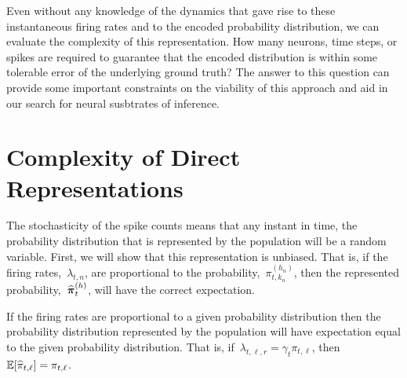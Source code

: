 Even without any knowledge of the dynamics that gave rise
to these instantaneous firing rates and to the
encoded probability distribution, we can evaluate the complexity
of this representation. How many neurons, time steps, or spikes
are required to guarantee that the encoded distribution is within
some tolerable error of the underlying ground truth? The answer
to this question can provide some important constraints on the
viability of this approach and aid in our search for neural
susbtrates of inference. 

\section{Complexity of Direct Representations}
The stochasticity of the spike counts means that any instant in 
time, the probability distribution that is represented by the population will 
be a random variable.  First, we will show that this representation 
is unbiased. That is, if the firing rates,~$\lambda_{t, n}$, 
are proportional to the probability,~$\pi_{t,k_n}^{(h_n)}$, then the 
represented probability,~$\widehat{\boldsymbol{\pi}}_{t}^{(h)}$, will have the  
correct expectation.

\begin{lemma}
\label{lem:consistency}
If the firing rates are proportional to a given
probability distribution then the probability distribution represented by the 
population will have expectation equal to the given probability distribution.
That is, if~$\lambda_{t, \ell, r}=\gamma_t \pi_{t,\ell}$, 
then~$\mathbb{E}[\widehat{\pi}_{t,\ell}] = \pi_{t,\ell}$.
\end{lemma}

